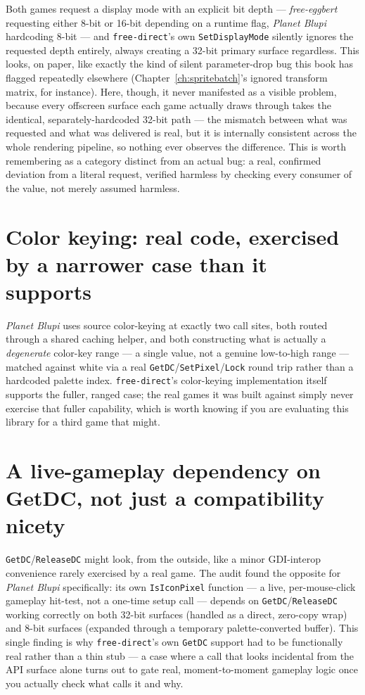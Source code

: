 Both games request a display mode with an explicit bit depth --- \emph{free-eggbert}
requesting either 8-bit or 16-bit depending on a runtime flag, \emph{Planet Blupi} hardcoding
8-bit --- and \texttt{free-direct}'s own \texttt{SetDisplayMode} silently ignores the
requested depth entirely, always creating a 32-bit primary surface regardless. This looks, on
paper, like exactly the kind of silent parameter-drop bug this book has flagged repeatedly
elsewhere (Chapter~\ref{ch:spritebatch}'s ignored transform matrix, for instance). Here,
though, it never manifested as a visible problem, because every offscreen surface each game
actually draws through takes the identical, separately-hardcoded 32-bit path --- the mismatch
between what was requested and what was delivered is real, but it is internally consistent
across the whole rendering pipeline, so nothing ever observes the difference. This is worth
remembering as a category distinct from an actual bug: a real, confirmed deviation from a
literal request, verified harmless by checking every consumer of the value, not merely
assumed harmless.

\section{Color keying: real code, exercised by a narrower case than it supports}

\emph{Planet Blupi} uses source color-keying at exactly two call sites, both routed through a
shared caching helper, and both constructing what is actually a \emph{degenerate} color-key
range --- a single value, not a genuine low-to-high range --- matched against white via a
real \texttt{GetDC}/\texttt{SetPixel}/\texttt{Lock} round trip rather than a hardcoded palette
index. \texttt{free-direct}'s color-keying implementation itself supports the fuller, ranged
case; the real games it was built against simply never exercise that fuller capability, which
is worth knowing if you are evaluating this library for a third game that might.

\section{A live-gameplay dependency on GetDC, not just a compatibility nicety}

\texttt{GetDC}/\texttt{ReleaseDC} might look, from the outside, like a minor GDI-interop
convenience rarely exercised by a real game. The audit found the opposite for
\emph{Planet Blupi} specifically: its own \texttt{IsIconPixel} function --- a live,
per-mouse-click gameplay hit-test, not a one-time setup call --- depends on
\texttt{GetDC}/\texttt{ReleaseDC} working correctly on both 32-bit surfaces (handled as a
direct, zero-copy wrap) and 8-bit surfaces (expanded through a temporary palette-converted
buffer). This single finding is why \texttt{free-direct}'s own \texttt{GetDC} support had to
be functionally real rather than a thin stub --- a case where a call that looks incidental
from the API surface alone turns out to gate real, moment-to-moment gameplay logic once you
actually check what calls it and why.

